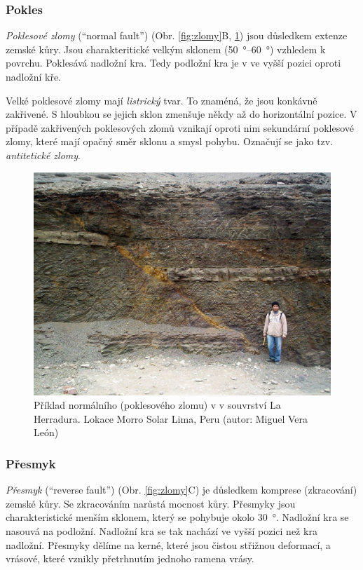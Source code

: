 \subsubsection{Pokles}
\emph{Poklesové zlomy} (\enquote{normal fault}) (Obr. \ref{fig:zlomy}B, \ref{fig:pokles}) jsou důsledkem extenze zemské kůry. Jsou charakteritické velkým sklonem (\SIrange{50}{60}{\degree}) vzhledem k povrchu. Poklesává nadložní kra. Tedy podložní kra je v ve vyšší pozici oproti nadložní kře. 

Velké poklesové zlomy mají \emph{listrický} tvar. To znaméná, že jsou konkávně zakřivené. S hloubkou se jejich sklon zmenšuje někdy až do horizontální pozice. V případě zakřivených poklesových zlomů vznikají oproti nim sekundární poklesové zlomy, které mají opačný směr sklonu a smysl pohybu. Označují se jako tzv. \emph{antitetické zlomy}.

\begin{figure}
	\centering
	\includegraphics[width=1\linewidth]{obrazky/tectonic/pokles}
	\caption{Příklad normálního (poklesového zlomu) v v souvrství La Herradura. Lokace Morro Solar Lima, Peru (autor: Miguel Vera León)}
	\label{fig:pokles}
\end{figure}

\subsubsection{Přesmyk}
\emph{Přesmyk} (\enquote{reverse fault}) (Obr. \ref{fig:zlomy}C) je důsledkem komprese (zkracování) zemské kůry. Se zkracováním narůstá mocnost kůry. Přesmyky jsou charakteristické menším sklonem, který se pohybuje okolo \SI{30}{\degree}. Nadložní kra se nasouvá na podložní. Nadložní kra se tak nachází ve vyšší pozici než kra nadložní. 
Přesmyky dělíme na kerné, které jsou čistou střižnou deformací, a vrásové, které vznikly přetrhnutím jednoho ramena vrásy.

